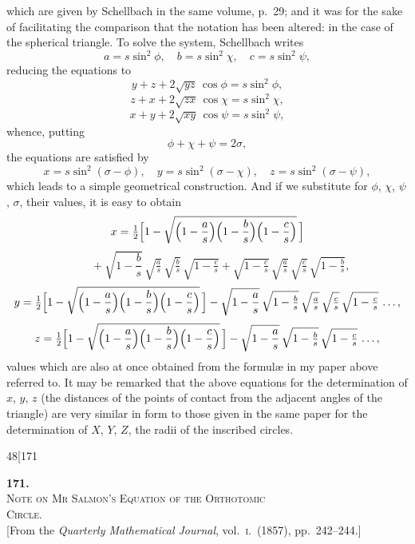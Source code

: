 \documentclass[11pt]{article}
\begin{document}
\noindent which are given by Schellbach in the same volume, p.~29; and it was for the sake
of facilitating the comparison that the notation has been altered: in the case of the
spherical triangle. To solve the system, Schellbach writes
\[
a = s\sin^{2}\phi,\quad b = s\sin^{2}\chi,\quad c = s\sin^{2}\psi,
\]
reducing the equations to
\[
y + z + 2\sqrt{yz}\,\cos\phi = s\sin^{2}\phi,
\]
\[
z + x + 2\sqrt{zx}\,\cos\chi = s\sin^{2}\chi,
\]
\[
x + y + 2\sqrt{xy}\,\cos\psi = s\sin^{2}\psi,
\]
whence, putting
\[
\phi + \chi + \psi = 2\sigma,
\]
the equations are satisfied by
\[
x = s\sin^{2}(\sigma - \phi),\quad y = s\sin^{2}(\sigma - \chi),\quad z = s\sin^{2}(\sigma - \psi),
\]
which leads to a simple geometrical construction. And if we substitute for $\phi$, $\chi$, $\psi$, $\sigma$,
their values, it is easy to obtain
\[
x = \tfrac{1}{2}\Bigl[1 - \sqrt{\Bigl(1 - \frac{a}{s}\Bigr)\Bigl(1 - \frac{b}{s}\Bigr)\Bigl(1 - \frac{c}{s}\Bigr)}\,\Bigr]
\]
\[
\phantom{x = \tfrac{1}{2}}+ \sqrt{1 - \frac{b}{s}}\,\sqrt{\tfrac{a}{s}}\,\sqrt{\tfrac{b}{s}}\,\sqrt{1 - \tfrac{c}{s}}
+ \sqrt{1 - \tfrac{c}{s}}\,\sqrt{\tfrac{a}{s}}\,\sqrt{\tfrac{c}{s}}\,\sqrt{1 - \tfrac{b}{s}},
\]
\[
y = \tfrac{1}{2}\Bigl[1 - \sqrt{\Bigl(1 - \frac{a}{s}\Bigr)\Bigl(1 - \frac{b}{s}\Bigr)\Bigl(1 - \frac{c}{s}\Bigr)}\,\Bigr]
- \sqrt{1 - \frac{a}{s}}\,\sqrt{1 - \tfrac{b}{s}}\,\sqrt{\tfrac{a}{s}}\,\sqrt{\tfrac{c}{s}}\,\sqrt{1 - \tfrac{c}{s}}\,\ldots,
\]
\[
z = \tfrac{1}{2}\Bigl[1 - \sqrt{\Bigl(1 - \frac{a}{s}\Bigr)\Bigl(1 - \frac{b}{s}\Bigr)\Bigl(1 - \frac{c}{s}\Bigr)}\,\Bigr]
- \sqrt{1 - \frac{a}{s}}\,\sqrt{1 - \tfrac{b}{s}}\,\sqrt{1 - \tfrac{c}{s}}\,\ldots,
\]
values which are also at once obtained from the formul\ae{} in my paper above referred
to. It may be remarked that the above equations for the determination of $x$, $y$, $z$
(the distances of the points of contact from the adjacent angles of the triangle) are
very similar in form to those given in the same paper for the determination of
$X$, $Y$, $Z$, the radii of the inscribed circles.

\newpage

\begin{center}
\small\textsc{48}\hfill\hfill[171
\end{center}

\bigskip

\begin{center}
{\large\textbf{171.}}\\[1em]
{\large\scshape Note on Mr Salmon's Equation of the Orthotomic\\ Circle.}\\[1em]
{\small [From the \textit{Quarterly Mathematical Journal}, vol.~\textsc{i}.\ (1857), pp.~242--244.]}
\end{center}
\end{document}
